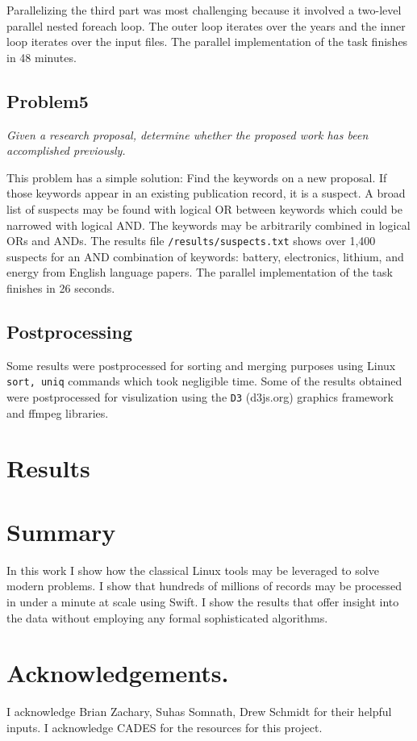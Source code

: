 \documentclass{article}
\begin{document}
Parallelizing the third part was most challenging because it involved a
two-level parallel nested foreach loop.  The outer loop iterates over the years
and the inner loop iterates over the input files. The parallel implementation
of the task finishes in 48 minutes.

\subsection*{Problem5}
\textit{Given a research proposal, determine whether the proposed work has been
accomplished previously.}

This problem has a simple solution: Find the keywords on a new proposal. If
those keywords appear in an existing publication record, it is a suspect. A
broad list of suspects may be found with logical OR between keywords which
could be narrowed with logical AND. The keywords may be arbitrarily combined in
logical ORs and ANDs. The results file \texttt{/results/suspects.txt} shows
over 1,400 suspects for an AND combination of keywords:  battery, electronics,
lithium, and energy from English language papers. The parallel implementation
of the task finishes in 26 seconds.

\subsection*{Postprocessing}
Some results were postprocessed for sorting and merging purposes using Linux
\texttt{sort, uniq} commands which took negligible time. Some of the results
obtained were postprocessed for visulization using the \texttt{D3} (d3js.org)
graphics framework and ffmpeg libraries.

\section*{Results}

\section*{Summary}
In this work I show how the classical Linux tools may be leveraged to solve
modern problems. I show that hundreds of millions of records may be processed
in under a minute at scale using Swift. I show the results that offer insight
into the data without employing any formal sophisticated algorithms.

\section*{Acknowledgements.}
I acknowledge Brian Zachary, Suhas Somnath, Drew Schmidt for their helpful
inputs. I acknowledge CADES for the resources for this project.
\end{document}
